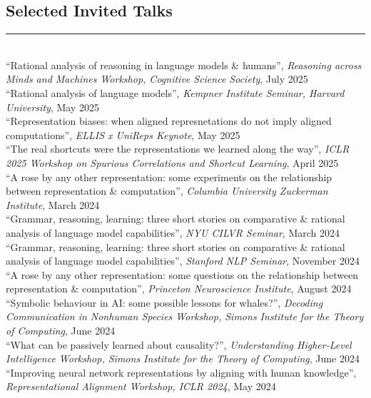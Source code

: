 \documentclass[margin]{res}
\begin{document}
\begin{resume}
\vspace{1pt}\section{Selected Invited Talks} \vspace{-15pt} \rule{\textwidth}{0.5pt} \\[3pt]
{``Rational analysis of reasoning in language models \& humans'',} \textit{Reasoning across Minds and Machines Workshop, Cognitive Science Society}, July 2025\\[3pt] 
{``Rational analysis of language models'',} \textit{Kempner Institute Seminar, Harvard University}, May 2025\\[3pt] 
{``Representation biases: when aligned represnetations do not imply aligned computations'',} \textit{ELLIS x UniReps Keynote}, May 2025\\[3pt] 
{``The real shortcuts were the representations we learned along the way'',} \textit{ICLR 2025 Workshop on Spurious Correlations and Shortcut Learning}, April 2025\\[3pt] 
{``A rose by any other representation: some experiments on the relationship between representation \& computation'',} \textit{Columbia University Zuckerman Institute}, March 2024\\[3pt] 
{``Grammar, reasoning, learning: three short stories on comparative \& rational analysis of language model capabilities'',} \textit{NYU CILVR Seminar}, March 2024\\[3pt] 
{``Grammar, reasoning, learning: three short stories on comparative \& rational analysis of language model capabilities'',} \textit{Stanford NLP Seminar}, November 2024\\[3pt] 
{``A rose by any other representation: some questions on the relationship between representation \& computation'',} \textit{Princeton Neuroscience Institute}, August 2024\\[3pt] 
{``Symbolic behaviour in AI: some possible lessons for whales?'',} \textit{Decoding Communication in Nonhuman Species Workshop, Simons Institute for the Theory of Computing}, June 2024\\[3pt]
{``What can be passively learned about causality?'',} \textit{Understanding Higher-Level Intelligence Workshop, Simons Institute for the Theory of Computing}, June 2024
{``Improving neural network representations by aligning with human knowledge'',} \textit{Representational Alignment Workshop, ICLR 2024}, May 2024\\[3pt] 

\end{resume}
\end{document}
